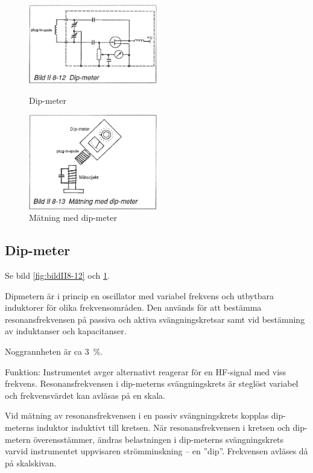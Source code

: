 \begin{figure}
  \includegraphics[width=0.5\textwidth]{images/bild_2_8-12}
  \caption{Dip-meter}
  \label{fig:bildII8-12}

  \includegraphics[width=0.5\textwidth]{images/bild_2_8-13}
  \caption{Mätning med dip-meter}
  \label{fig:bildII8-13}
\end{figure}

\subsection{Dip-meter}

Se bild \ref{fig:bildII8-12} och \ref{fig:bildII8-13}.

Dipmetern är i princip en oscillator med variabel frekvens och
utbytbara induktorer för olika frekvensområden.  Den används för att
bestämma resonansfrekvensen på passiva och aktiva svängningskretsar
samt vid bestämning av induktanser och kapacitanser.

Noggrannheten är ca 3~\%.

Funktion: Instrumentet avger alternativt reagerar för en HF-signal med
viss frekvens.  Resonansfrekvensen i dip-meterns svängningskrets är
steglöst variabel och frekvensvärdet kan avläsas på en skala.

Vid mätning av resonansfrekvensen i en passiv svängningskrets kopplas
dip-meterns induktor induktivt till kretsen. När resonansfrekvensen i
kretsen och dip-metern överensstämmer, ändras belastningen i
dip-meterns svängningskrets varvid instrumentet uppvisaren
strömminskning -- en ''dip''. Frekvensen avläses då på skalskivan.

